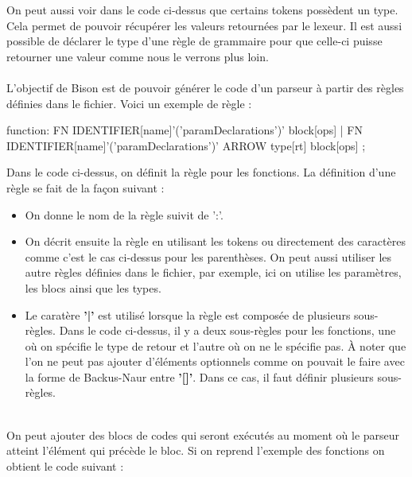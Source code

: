 \documentclass[a4paper]{article}%
\begin{document}
On peut aussi voir dans le code ci-dessus que certains tokens possèdent un type.
Cela permet de pouvoir récupérer les valeurs retournées par le lexeur. Il est
aussi possible de déclarer le type d'une règle de grammaire pour que celle-ci
puisse retourner une valeur comme nous le verrons plus loin.\\~\\


L'objectif de Bison est de pouvoir générer le code d'un parseur à partir des
règles définies dans le fichier. Voici un exemple de règle :

\begin{code}[language=c++]
function:
        FN IDENTIFIER[name]'('paramDeclarations')' block[ops]
        |
        FN IDENTIFIER[name]'('paramDeclarations')' ARROW type[rt] block[ops]
        ;
\end{code}\leavevmode\newline

Dans le code ci-dessus, on définit la règle pour les fonctions. La définition
d'une règle se fait de la façon suivant :

\begin{itemize}
  \item On donne le nom de la règle suivit de ':'.
  \item On décrit ensuite la règle en utilisant les tokens ou directement des
    caractères comme c'est le cas ci-dessus pour les parenthèses. On peut aussi
    utiliser les autre règles définies dans le fichier, par exemple, ici on
    utilise les paramètres, les blocs ainsi que les types.
  \item Le caratère \textbf{'|'} est utilisé lorsque la règle est composée de
    plusieurs sous-règles. Dans le code ci-dessus, il y a deux sous-règles pour
    les fonctions, une où on spécifie le type de retour et l'autre où on ne le
    spécifie pas. À noter que l'on ne peut pas ajouter d'éléments optionnels
    comme on pouvait le faire avec la forme de Backus-Naur entre \textbf{'[]'}.
    Dans ce cas, il faut définir plusieurs sous-règles.
\end{itemize}~\\

On peut ajouter des blocs de codes qui seront exécutés au moment où le parseur
atteint l'élément qui précède le bloc. Si on reprend l'exemple des fonctions on
obtient le code suivant :

\leavevmode\newline
\end{document}
